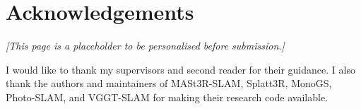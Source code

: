 \chapter*{Acknowledgements}

\emph{[This page is a placeholder to be personalised before submission.]}

I would like to thank my supervisors and second reader for their guidance.
I also thank the authors and maintainers of MASt3R-SLAM, Splatt3R, MonoGS,
Photo-SLAM, and VGGT-SLAM for making their research code available.
